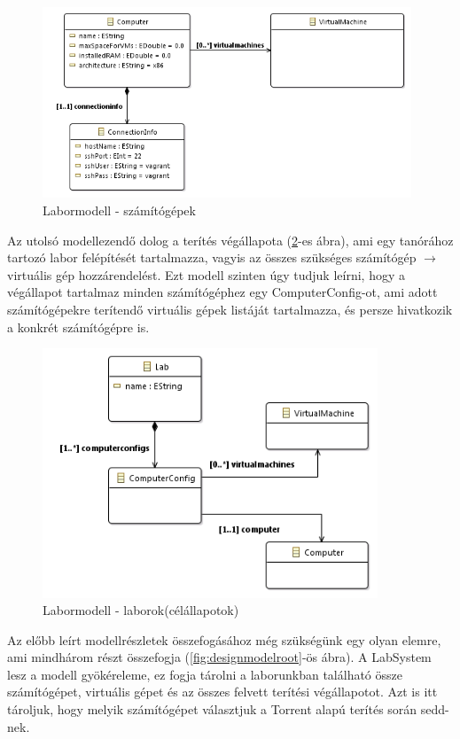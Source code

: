 \begin{figure}[ht]
	\centering
	\includegraphics[width=110mm, keepaspectratio]{figures/design_computer.png}
	\caption{Labormodell - számítógépek}
	\label{fig:designcomputers}
\end{figure}

Az utolsó modellezendő dolog a terítés végállapota (\ref{fig:designlab}-es ábra), ami egy tanórához tartozó labor felépítését tartalmazza, vagyis az összes szükséges számítógép $\rightarrow$ virtuális gép hozzárendelést. Ezt modell szinten úgy tudjuk leírni, hogy a végállapot tartalmaz minden számítógéphez egy ComputerConfig-ot, ami adott számítógépekre terítendő virtuális gépek listáját tartalmazza, és persze hivatkozik a konkrét számítógépre is.

\begin{figure}[h!]
	\centering
	\includegraphics[width=100mm, keepaspectratio]{figures/design_lab.png}
	\caption{Labormodell - laborok(célállapotok)}
	\label{fig:designlab}
\end{figure}

Az előbb leírt modellrészletek összefogásához még szükségünk egy olyan elemre, ami mindhárom részt összefogja (\ref{fig:designmodelroot}-ös ábra). A LabSystem lesz a modell gyökéreleme, ez fogja tárolni a laborunkban található össze számítógépet, virtuális gépet és az összes felvett terítési végállapotot. Azt is itt tároljuk, hogy melyik számítógépet választjuk a Torrent alapú terítés során sedd-nek.

